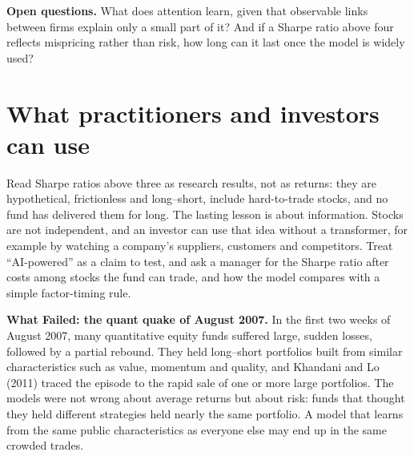 \label{sec:22-open}
\textbf{Open questions.} What does attention learn, given that observable links between firms explain only a small part of it? And if a Sharpe ratio above four reflects mispricing rather than risk, how long can it last once the model is widely used?

\section{What practitioners and investors can use}
\label{sec:22-investors}

Read Sharpe ratios above three as research results, not as returns: they are hypothetical, frictionless and long--short, include hard-to-trade stocks, and no fund has delivered them for long. The lasting lesson is about information. Stocks are not independent, and an investor can use that idea without a transformer, for example by watching a company's suppliers, customers and competitors. Treat ``AI-powered'' as a claim to test, and ask a manager for the Sharpe ratio after costs among stocks the fund can trade, and how the model compares with a simple factor-timing rule.

\begin{callout}
\textbf{What Failed: the quant quake of August 2007.} In the first two weeks of August 2007, many quantitative equity funds suffered large, sudden losses, followed by a partial rebound. They held long--short portfolios built from similar characteristics such as value, momentum and quality, and Khandani and Lo (2011) traced the episode to the rapid sale of one or more large portfolios. The models were not wrong about average returns but about risk: funds that thought they held different strategies held nearly the same portfolio. A model that learns from the same public characteristics as everyone else may end up in the same crowded trades.
\end{callout}
